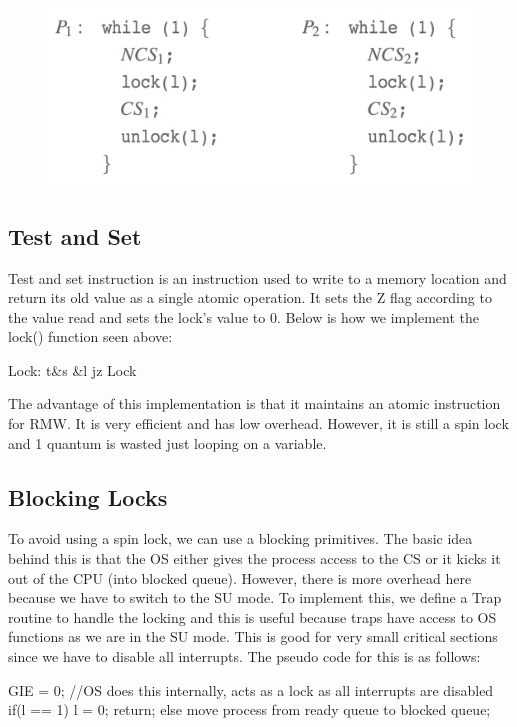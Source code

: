 \documentclass{hw}
\begin{document}
\begin{figure}[H]
  \centering
  \includegraphics[scale=.4]{lock}
\end{figure}

\subsection{Test and Set}
Test and set instruction is an instruction used to write to a memory location 
and return its old value as a single atomic operation. It sets the Z flag 
according to the value read and sets the lock's value to 0. Below is how we
implement the lock() function seen above:
\begin{C}
Lock:   t&s &l
        jz Lock
\end{C} 
The advantage of this implementation is that it maintains an atomic instruction 
for RMW. It is very efficient and has low overhead. However, it is still a 
spin lock and 1 quantum is wasted just looping on a variable.
    
\subsection{Blocking Locks}
To avoid using a spin lock, we can use a blocking primitives. The basic idea behind
this is that the OS either gives the process access to the CS or it kicks it out
of the CPU (into blocked queue). However, there is more overhead here because we
have to switch to the SU mode. To implement this, we define a Trap routine to handle
the locking and this is useful because traps have access to OS functions as we are
in the SU mode. This is good for very small critical sections since we have to 
disable all interrupts. The pseudo code for this is as follows:
\begin{C}
GIE = 0; //OS does this internally, acts as a lock as all interrupts are disabled
if(l == 1){
  l = 0;
  return;
}
else{
  move process from ready queue to blocked queue;
}
\end{C}
\end{document}
